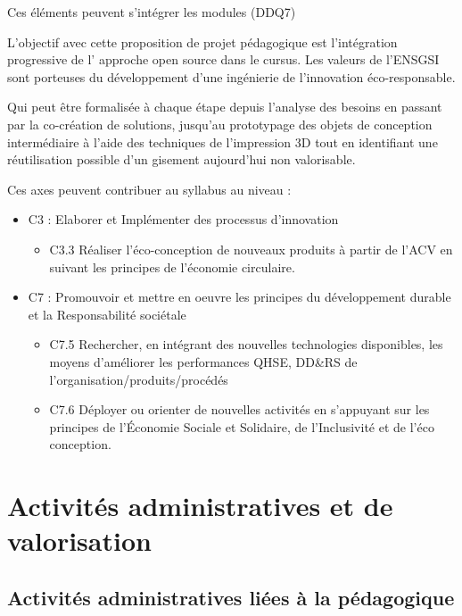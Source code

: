 \documentclass[
  11pt,
]{article}
\providecommand{\tightlist}{%
  \setlength{\itemsep}{0pt}\setlength{\parskip}{0pt}}\usepackage{longtable,booktabs,array}
\begin{document}
Ces éléments peuvent s'intégrer les modules (DDQ7)

L'objectif avec cette proposition de projet pédagogique est
l'intégration progressive de l' approche open source dans le cursus. Les
valeurs de l'ENSGSI sont porteuses du développement d'une ingénierie de
l'innovation éco-responsable.

Qui peut être formalisée à chaque étape depuis l'analyse des besoins en
passant par la co-création de solutions, jusqu'au prototypage des objets
de conception intermédiaire à l'aide des techniques de l'impression 3D
tout en identifiant une réutilisation possible d'un gisement aujourd'hui
non valorisable.

Ces axes peuvent contribuer au syllabus au niveau :

\begin{itemize}
\item
  C3 : Elaborer et Implémenter des processus d'innovation

  \begin{itemize}
  \tightlist
  \item
    C3.3 Réaliser l'éco-conception de nouveaux produits à partir de
    l'ACV en suivant les principes de l'économie circulaire.
  \end{itemize}
\item
  C7 : Promouvoir et mettre en oeuvre les principes du développement
  durable et la Responsabilité sociétale

  \begin{itemize}
  \item
    C7.5 Rechercher, en intégrant des nouvelles technologies
    disponibles, les moyens d'améliorer les performances QHSE, DD\&RS de
    l'organisation/produits/procédés
  \item
    C7.6 Déployer ou orienter de nouvelles activités en s'appuyant sur
    les principes de l'Économie Sociale et Solidaire, de l'Inclusivité
    et de l'éco conception.
  \end{itemize}
\end{itemize}

\hypertarget{activituxe9s-administratives-et-de-valorisation}{%
\section{Activités administratives et de
valorisation}\label{activituxe9s-administratives-et-de-valorisation}}

\hypertarget{activituxe9s-administratives-liuxe9es-uxe0-la-puxe9dagogique}{%
\subsection{Activités administratives liées à la
pédagogique}\label{activituxe9s-administratives-liuxe9es-uxe0-la-puxe9dagogique}}
\end{document}
